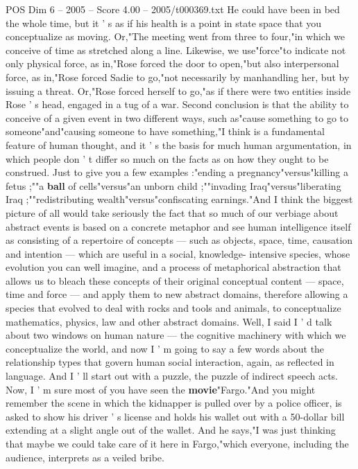 \begin{textsample}{POS Dim 6 – 2005 – Score 4.00 – 2005/t000369.txt}
He could have been in bed the whole time, but it ' s as if his health is a point in state space that you conceptualize as moving.
Or,"The meeting went from three to four,"in which we conceive of time as stretched along a line.
Likewise, we use"force"to indicate not only physical force, as in,"Rose forced the door to open,"but also interpersonal force, as in,"Rose forced Sadie to go,"not necessarily by manhandling her, but by issuing a threat.
Or,"Rose forced herself to go,"as if there were two entities inside Rose ' s head, engaged in a tug of a war.
Second conclusion is that the ability to conceive of a given event in two different ways, such as"cause something to go to someone"and"causing someone to have something,"I think is a fundamental feature of human thought, and it ' s the basis for much human argumentation, in which people don ' t differ so much on the facts as on how they ought to be construed.
Just to give you a few examples :"ending a pregnancy"versus"killing a fetus ;""a \textbf{ball} of cells"versus"an unborn child ;""invading Iraq"versus"liberating Iraq ;""redistributing wealth"versus"confiscating earnings."And I think the biggest picture of all would take seriously the fact that so much of our verbiage about abstract events is based on a concrete metaphor and see human intelligence itself as consisting of a repertoire of concepts — such as objects, space, time, causation and intention — which are useful in a social, knowledge- intensive species, whose evolution you can well imagine, and a process of metaphorical abstraction that allows us to bleach these concepts of their original conceptual content — space, time and force — and apply them to new abstract domains, therefore allowing a species that evolved to deal with rocks and tools and animals, to conceptualize mathematics, physics, law and other abstract domains.
Well, I said I ' d talk about two windows on human nature — the cognitive machinery with which we conceptualize the world, and now I ' m going to say a few words about the relationship types that govern human social interaction, again, as reflected in language.
And I ' ll start out with a puzzle, the puzzle of indirect speech acts.
Now, I ' m sure most of you have seen the \textbf{movie}"Fargo."And you might remember the scene in which the kidnapper is pulled over by a police officer, is asked to show his driver ' s license and holds his wallet out with a 50-dollar bill extending at a slight angle out of the wallet.
And he says,"I was just thinking that maybe we could take care of it here in Fargo,"which everyone, including the audience, interprets as a veiled bribe.

\end{textsample}
